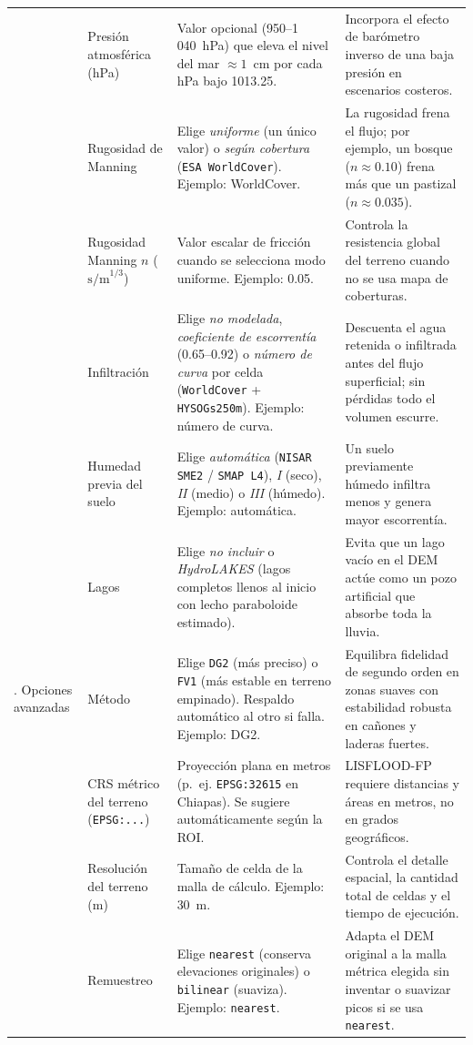 \documentclass[11pt,letterpaper]{article}
\begin{document}
{\begin{longtable}{@{}>{\raggedright\arraybackslash}p{2.2cm}>{\raggedright\arraybackslash}p{3.1cm}>{\raggedright\arraybackslash}p{5.4cm}>{\raggedright\arraybackslash}p{5.2cm}@{}}
 & Presión atmosférica (hPa) & Valor opcional (950--1\,040~hPa) que eleva el nivel del mar $\approx 1$~cm por cada hPa bajo 1013.25. & Incorpora el efecto de barómetro inverso de una baja presión en escenarios costeros.\\
 & Rugosidad de Manning & Elige \emph{uniforme} (un único valor) o \emph{según cobertura} (\texttt{ESA WorldCover}). Ejemplo: WorldCover. & La rugosidad frena el flujo; por ejemplo, un bosque ($n \approx 0.10$) frena más que un pastizal ($n \approx 0.035$).\\
 & Rugosidad Manning $n$ ($\text{s/m}^{1/3}$) & Valor escalar de fricción cuando se selecciona modo uniforme. Ejemplo: 0.05. & Controla la resistencia global del terreno cuando no se usa mapa de coberturas.\\
 & Infiltración & Elige \emph{no modelada}, \emph{coeficiente de escorrentía} (0.65--0.92) o \emph{número de curva} por celda (\texttt{WorldCover} + \texttt{HYSOGs250m}). Ejemplo: número de curva. & Descuenta el agua retenida o infiltrada antes del flujo superficial; sin pérdidas todo el volumen escurre.\\
 & Humedad previa del suelo & Elige \emph{automática} (\texttt{NISAR SME2} / \texttt{SMAP L4}), \emph{I} (seco), \emph{II} (medio) o \emph{III} (húmedo). Ejemplo: automática. & Un suelo previamente húmedo infiltra menos y genera mayor escorrentía.\\
 & Lagos & Elige \emph{no incluir} o \emph{HydroLAKES} (lagos completos llenos al inicio con lecho paraboloide estimado). & Evita que un lago vacío en el DEM actúe como un pozo artificial que absorbe toda la lluvia.\\
4. Opciones avanzadas & Método & Elige \texttt{DG2} (más preciso) o \texttt{FV1} (más estable en terreno empinado). Respaldo automático al otro si falla. Ejemplo: DG2. & Equilibra fidelidad de segundo orden en zonas suaves con estabilidad robusta en cañones y laderas fuertes.\\
 & CRS métrico del terreno (\texttt{EPSG:...}) & Proyección plana en metros (p.~ej. \texttt{EPSG:32615} en Chiapas). Se sugiere automáticamente según la ROI. & LISFLOOD-FP requiere distancias y áreas en metros, no en grados geográficos.\\
 & Resolución del terreno (m) & Tamaño de celda de la malla de cálculo. Ejemplo: 30~m. & Controla el detalle espacial, la cantidad total de celdas y el tiempo de ejecución.\\
 & Remuestreo & Elige \texttt{nearest} (conserva elevaciones originales) o \texttt{bilinear} (suaviza). Ejemplo: \texttt{nearest}. & Adapta el DEM original a la malla métrica elegida sin inventar o suavizar picos si se usa \texttt{nearest}.\\

\end{longtable}}
\end{document}
